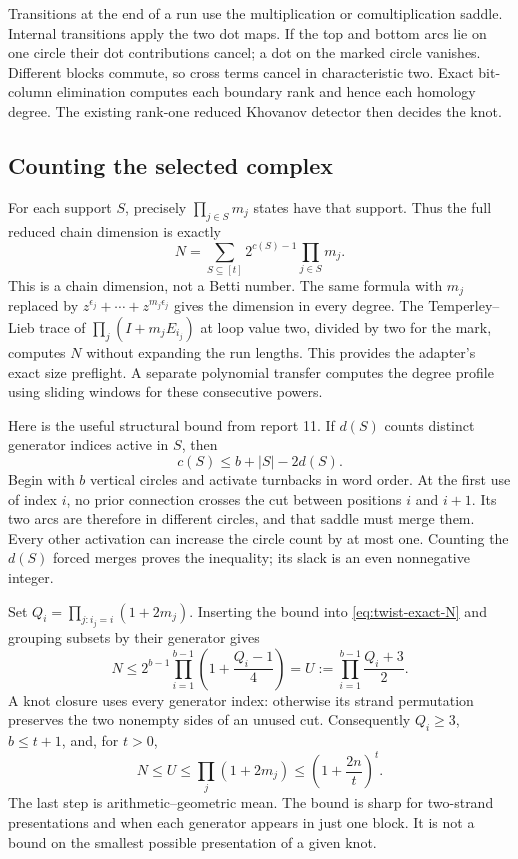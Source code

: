 Transitions at the end of a run use the multiplication or
comultiplication saddle. Internal transitions apply the two dot maps.
If the top and bottom arcs lie on one circle their dot contributions
cancel; a dot on the marked circle vanishes. Different blocks commute,
so cross terms cancel in characteristic two. Exact bit-column
elimination computes each boundary rank and hence each homology degree.
The existing rank-one reduced Khovanov detector then decides the knot.

\subsection{Counting the selected complex}
For each support $S$, precisely $\prod_{j\in S}m_j$ states have that
support. Thus the full reduced chain dimension is exactly
\begin{equation}
 N=\sum_{S\subseteq[t]}2^{c(S)-1}\prod_{j\in S}m_j.
 \label{eq:twist-exact-N}
\end{equation}
This is a chain dimension, not a Betti number. The same formula with
$m_j$ replaced by $z^{\epsilon_j}+\cdots+z^{m_j\epsilon_j}$ gives
the dimension in every degree. The Temperley--Lieb trace of
$\prod_j(I+m_jE_{i_j})$ at loop value two, divided by two for the mark,
computes $N$ without expanding the run lengths. This provides the
adapter's exact size preflight. A separate polynomial transfer computes
the degree profile using sliding windows for these consecutive powers.

Here is the useful structural bound from report 11. If $d(S)$ counts
distinct generator indices active in $S$, then
\[
 c(S)\le b+|S|-2d(S).
\]
Begin with $b$ vertical circles and activate turnbacks in word order.
At the first use of index $i$, no prior connection crosses the cut
between positions $i$ and $i+1$. Its two arcs are therefore in different
circles, and that saddle must merge them. Every other activation can
increase the circle count by at most one. Counting the $d(S)$ forced
merges proves the inequality; its slack is an even nonnegative integer.

Set $Q_i=\prod_{j:i_j=i}(1+2m_j)$. Inserting the bound into
\eqref{eq:twist-exact-N} and grouping subsets by their generator gives
\[
 N\le 2^{b-1}\prod_{i=1}^{b-1}
       \left(1+\frac{Q_i-1}{4}\right)
   =U:=\prod_{i=1}^{b-1}\frac{Q_i+3}{2}.
\]
A knot closure uses every generator index: otherwise its strand
permutation preserves the two nonempty sides of an unused cut.
Consequently $Q_i\ge3$, $b\le t+1$, and, for $t>0$,
\begin{equation}
 N\le U\le\prod_j(1+2m_j)
       \le\left(1+\frac{2n}{t}\right)^t.
 \label{eq:twist-run-bound}
\end{equation}
The last step is arithmetic--geometric mean. The bound is sharp for
two-strand presentations and when each generator appears in just one
block. It is not a bound on the smallest possible presentation of a
given knot.

